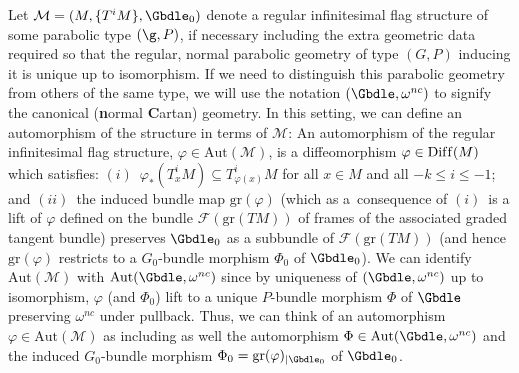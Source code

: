 \begin{Remark} \label{underlying automorphisms} Let $\mathcal{M} = (M,\{T^iM\},\Gbdle_0)$ denote a regular inf\/initesimal f\/lag structure of some parabolic type $(\g,P)$, if necessary including the extra geometric data required so that the regular, normal parabolic geometry of type $(G,P)$ inducing it is unique up to isomorphism. If we need to distinguish this parabolic geometry from others of the same type, we will use the notation $(\Gbdle,\omega^{nc})$ to signify the canonical (\textbf{n}ormal \textbf{C}artan) geometry. In this setting, we can def\/ine an automorphism of the structure in terms of $\mathcal{M}$: An automorphism of the regular inf\/initesimal f\/lag structure, $\varphi \in \mathrm{Aut}(\mathcal{M})$, is a dif\/feomorphism $\varphi \in \mathrm{Dif\/f}(M)$ which satisf\/ies: $(i)$~$\varphi_*(T_x^iM) \subseteq T_{\varphi(x)}^iM$ for all $x \in M$ and all $-k \leq i \leq -1$; and $(ii)$~the induced bundle map $\mathrm{gr}(\varphi)$ (which as a~consequence of $(i)$~is a lift of $\varphi$ def\/ined on the bundle $\mathcal{F}(\mathrm{gr}(TM))$ of frames of the associated graded tangent bundle) preserves $\Gbdle_0$ as a subbundle of $\mathcal{F}(\mathrm{gr}(TM))$ (and hence $\mathrm{gr}(\varphi)$ restricts to a $G_0$-bundle morphism $\Phi_0$ of $\Gbdle_0$). We can identify $\mathrm{Aut}(\mathcal{M})$ with $\mathrm{Aut}(\Gbdle,\omega^{nc})$ since by uniqueness of $(\Gbdle,\omega^{nc})$ up to isomorphism, $\varphi$ (and $\Phi_0$) lift to a unique $P$-bundle morphism $\Phi$ of $\Gbdle$ preserving $\omega^{nc}$ under pullback. Thus, we can think of an automorphism $\varphi \in \mathrm{Aut}(\mathcal{M})$ as including as well the automorphism $\Phi \in \mathrm{Aut}(\Gbdle,\omega^{nc})$ and the induced $G_0$-bundle morphism $\Phi_0 = \mathrm{gr}(\varphi)_{\vert \Gbdle_0}$ of $\Gbdle_0$.
\end{Remark}

